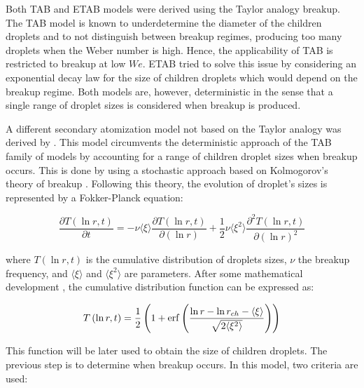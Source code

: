 Both TAB and ETAB models were derived using the Taylor analogy breakup. The TAB model is known to underdetermine the diameter of the children droplets and to not distinguish between breakup regimes, producing too many droplets when the Weber number is high. Hence, the applicability of TAB is restricted to breakup at low $We$. ETAB tried to solve this issue by considering an exponential decay law for the size of children droplets which would depend on the breakup regime. Both models are, however, deterministic in the sense that a single range of droplet sizes is considered when breakup is produced.

A different secondary atomization model not based on the Taylor analogy was derived by . This model circumvents the deterministic approach of the TAB family of models by accounting for a range of children droplet sizes when breakup occurs. This is done by using a stochastic approach based on Kolmogorov's theory of breakup . Following this theory, the evolution of droplet's sizes is represented by a Fokker-Planck equation: 

\begin{equation}
\frac{\partial T \left( \ln r, t \right)}{\partial t} = - \nu  \langle \xi \rangle  \frac{\partial T \left( \ln r, t \right)}{\partial \left( \ln r \right)} + \frac{1}{2} \nu  \langle \xi^2 \rangle  \frac{\partial^2 T \left( \ln r, t \right)}{\partial \left( \ln r \right)^2}
\end{equation}

where $T \left( \ln r, t \right)$ is the cumulative distribution of droplets sizes, $\nu$ the breakup frequency, and  $\langle \xi \rangle$ and $ \langle \xi^2 \rangle$ are parameters. After some mathematical development , the cumulative distribution function can be expressed as:

\begin{equation}
\label{eq:gorokhovski_T_CDF}
T \left( \ln r, t \right) = \frac{1}{2} \left( 1 + \operatorname{erf} \left( \frac{\ln r - \ln r_{ch} - \langle \xi \rangle }{\sqrt{2 \langle \xi^2 \rangle}}\right)  \right)
\end{equation}

This function will be later used to obtain the size of children droplets. The previous step is to determine when breakup occurs. In this model, two criteria are used:

